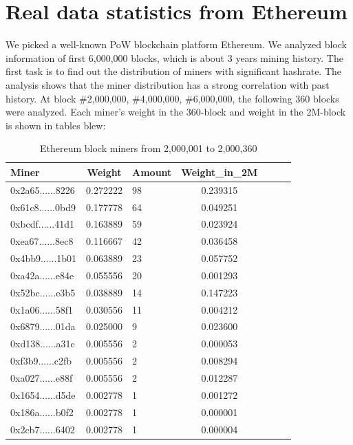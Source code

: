 \documentclass[conference]{IEEEtran}
\begin{document}
\section{Real data statistics from Ethereum}

We picked a well-known PoW blockchain platform Ethereum. We analyzed block information of first 6,000,000 blocks, which is about 3 years mining history. The first task is to find out the distribution of miners with significant hashrate. The analysis shows that the miner distribution has a strong correlation with past history. At block \#2,000,000, \#4,000,000, \#6,000,000, the following 360 blocks were analyzed. Each miner's weight in the 360-block and weight in the 2M-block is shown in tables blew:

\begin{table}[htbp]
\caption{Ethereum block miners from 2,000,001 to 2,000,360}
\begin{center}
\begin{tabular}{lclclcl}
\hline
Miner                                      & Weight   & Amount & Weight\_in\_2M \\
\hline
0x2a65......8226 & 0.272222 & 98     & 0.239315       \\
0x61c8......0bd9 & 0.177778 & 64     & 0.049251       \\
0xbcdf......41d1 & 0.163889 & 59     & 0.023924       \\
0xea67......8ec8 & 0.116667 & 42     & 0.036458       \\
0x4bb9......1b01 & 0.063889 & 23     & 0.057752       \\
0xa42a......e84e & 0.055556 & 20     & 0.001293       \\
0x52bc......e3b5 & 0.038889 & 14     & 0.147223       \\
0x1a06......58f1 & 0.030556 & 11     & 0.004212       \\
0x6879......01da & 0.025000 & 9      & 0.023600       \\
0xd138......a31c & 0.005556 & 2      & 0.000053       \\
0xf3b9......c2fb & 0.005556 & 2      & 0.008294       \\
0xa027......e88f & 0.005556 & 2      & 0.012287       \\
0x1654......d5de & 0.002778 & 1      & 0.001272       \\
0x186a......b0f2 & 0.002778 & 1      & 0.000001       \\
0x2cb7......6402 & 0.002778 & 1      & 0.000004       \\

\end{tabular}
\end{center}
\end{table}
\end{document}
